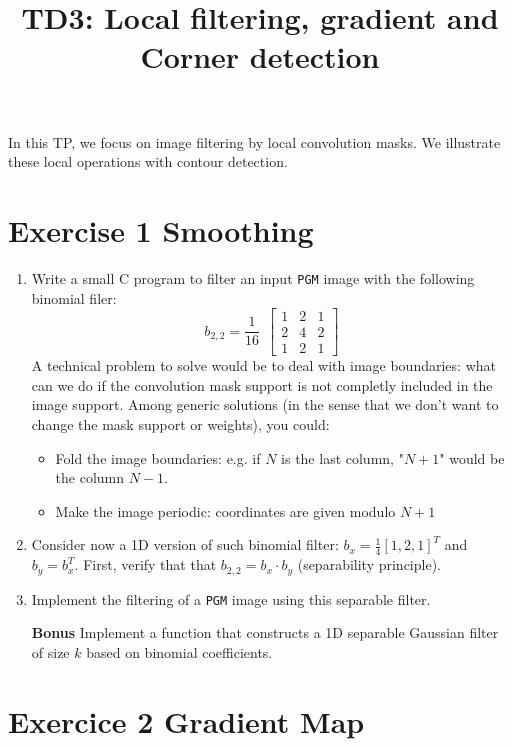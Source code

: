 \documentclass[a4paper, 11pt, french]{article}
\title{\bf{TD3: Local filtering, gradient and Corner detection}}
\author{}
\date{}
\begin{document}
\maketitle



In this TP, we focus on image filtering by local convolution masks. We illustrate these local operations with contour detection.


\section*{Exercise 1 \rm Smoothing}
\begin{enumerate}
	\item Write a small C program to filter an input \texttt{PGM} image with the following binomial filer:
	\[
		b_{2,2} = \frac{1}{16}~~
		\begin{bmatrix}
		1 & 2 &1 \\
		2 & 4 & 2\\
		1 & 2 & 1
		\end{bmatrix}
	\]
	A technical problem to solve would be to deal with image boundaries: what can we do if the convolution mask support is not completly included in the  image support. Among generic solutions (in the sense that we don't want to change the mask support or weights), you could:
	\begin{itemize}
		\item Fold the image boundaries: e.g. if $N$ is the last column, "$N+1$" would be the column $N-1$.
		\item Make the image periodic: coordinates are given modulo $N+1$
	\end{itemize}
	\item Consider now a 1D version of such binomial filter: $b_x=\frac{1}{4}[1,2,1]^T$ and $b_y=b_x^T$. First, verify that that $b_{2,2}=b_x\cdot b_y$ (separability principle).
	\item Implement the filtering of a \texttt{PGM} image using this separable filter.
	\item[\textbf{Bonus}] Implement a function that constructs a 1D separable Gaussian filter of size $k$ based on binomial coefficients.
\end{enumerate}



\section*{Exercice 2 \rm Gradient Map}
\end{document}
